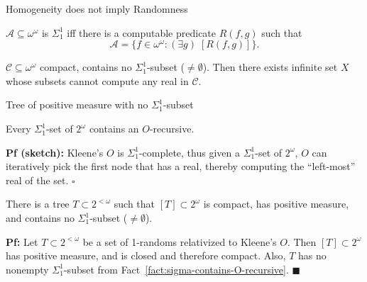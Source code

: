 \begin{frame}{Homogeneity does not imply Randomness}
  \begin{center}
  \end{center}

  \begin{define*}
    $\mathcal{A}\subseteq\omega^\omega$ is $\Sigma_1^1$ iff there is a
    computable predicate $R(f,g)$ such that
    \[\mathcal{A} =\{f\in\omega^\omega: (\exists g)\; [R(f,g)]\}.\]
  \end{define*}

  \begin{main-thm*}
    $\mathcal{C}\subseteq\omega^\omega$ compact, contains no
    $\Sigma_1^1$-subset ($\neq\emptyset$). Then there exists infinite set
    $X$ whose subsets cannot compute any real in $\mathcal{C}$.
  \end{main-thm*}
\end{frame}

\begin{frame}{Tree of positive measure with no $\Sigma_1^1$-subset}
  \begin{fact}
    \label{fact:sigma-contains-O-recursive}
    Every $\Sigma_1^1$-set of $2^\omega$ contains an $O$-recursive.
  \end{fact}
  \textbf{Pf (sketch):} Kleene's $O$ is $\Sigma_1^1$-complete, thus given a 
  $\Sigma_1^1$-set of $2^\omega$, $O$ can iteratively pick the first node
  that has a real, thereby computing the ``left-most'' real of the set.
  $\square$

  \vspace{1em}
  \begin{thm}
    There is a tree $T\subset2^{<\omega}$ such that $[T]\subset
    2^\omega$ is compact, has positive measure, and contains no
    $\Sigma_1^1$-subset ($\neq\emptyset$).
  \end{thm}
  \textbf{Pf:} Let $T\subset2^{<\omega}$ be a set of 1-randoms
  relativized to Kleene's $O$. Then $[T]\subset 2^\omega$ has positive
  measure, and is closed and therefore compact. Also, $T$ has no nonempty
  $\Sigma_1^1$-subset from Fact~\ref{fact:sigma-contains-O-recursive}.
  $\blacksquare$
\end{frame}

